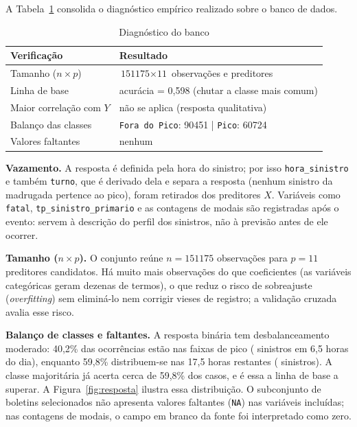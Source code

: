 \documentclass[
  article,
  12pt,
  oneside,
  a4paper,
  english,
  brazil
]{abntex2}\usepackage[]{graphicx}\usepackage[]{xcolor}
\begin{document}
A Tabela~\ref{tab:diag} consolida o diagnóstico empírico realizado sobre o banco de dados.

\begin{table}[htb]
  \centering
  \caption{Diagnóstico do banco}
  \label{tab:diag}
  \footnotesize
  \begin{tabular}{@{}p{}p{}@{}}
    \toprule
    \textbf{Verificação} & \textbf{Resultado} \\
    \midrule
    Tamanho ($n \times p$)   & $\text{151175} \times \text{11}$ observações e preditores \\
    Linha de base            & acur\'acia = 0,598 \quad (chutar a classe mais comum) \\
    Maior correlação com $Y$ & n\~ao se aplica (resposta qualitativa) \\
    Balanço das classes      & \texttt{Fora do Pico}: 90451 | \texttt{Pico}: 60724 \\
    Valores faltantes        & nenhum \\
    \bottomrule
  \end{tabular}
\end{table}

\textbf{Vazamento.} A resposta é definida pela hora do sinistro; por isso \texttt{hora\_sinistro} e também \texttt{turno}, que é derivado dela e separa a resposta (nenhum sinistro da madrugada pertence ao pico), foram retirados dos preditores $X$. Variáveis como \texttt{fatal}, \texttt{tp\_sinistro\_primario} e as contagens de modais são registradas após o evento: servem à descrição do perfil dos sinistros, não à previsão antes de ele ocorrer.

\textbf{Tamanho ($n \times p$).} O conjunto reúne $n = \text{151175}$ observações para $p = \text{11}$ preditores candidatos. Há muito mais observações do que coeficientes (as variáveis categóricas geram dezenas de termos), o que reduz o risco de sobreajuste (\textit{overfitting}) sem eliminá-lo nem corrigir vieses de registro; a validação cruzada avalia esse risco.

\textbf{Balanço de classes e faltantes.} A resposta binária tem desbalanceamento moderado: 40,2\% das ocorrências estão nas faixas de pico ( sinistros em 6,5 horas do dia), enquanto 59,8\% distribuem-se nas 17,5 horas restantes ( sinistros). A classe majoritária já acerta cerca de 59,8\% dos casos, e é essa a linha de base a superar. A Figura~\ref{fig:resposta} ilustra essa distribuição. O subconjunto de boletins selecionados não apresenta valores faltantes (\texttt{NA}) nas variáveis incluídas; nas contagens de modais, o campo em branco da fonte foi interpretado como zero.
\end{document}
